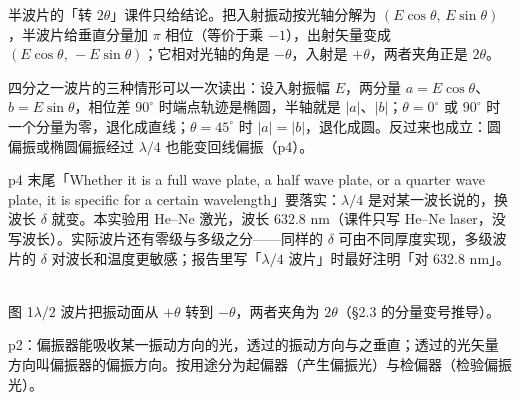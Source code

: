 \documentclass[11pt]{ctexart}
\begin{document}
半波片的「转 $2\theta$」课件只给结论。把入射振动按光轴分解为 $(E\cos\theta,\,E\sin\theta)$，半波片给垂直分量加 $\pi$ 相位（等价于乘 $-1$），出射矢量变成 $(E\cos\theta,\,-E\sin\theta)$；它相对光轴的角是 $-\theta$，入射是 $+\theta$，两者夹角正是 $2\theta$。


四分之一波片的三种情形可以一次读出：设入射振幅 $E$，两分量 $a=E\cos\theta$、$b=E\sin\theta$，相位差 $90^\circ$ 时端点轨迹是椭圆，半轴就是 $|a|$、$|b|$；$\theta=0^\circ$ 或 $90^\circ$ 时一个分量为零，退化成直线；$\theta=45^\circ$ 时 $|a|=|b|$，退化成圆。反过来也成立：圆偏振或椭圆偏振经过 $\lambda/4$ 也能变回线偏振（p4）。

p4 末尾「Whether it is a full wave plate, a half wave plate, or a quarter wave plate, it is specific for a certain wavelength」要落实：$\lambda/4$ 是对某一波长说的，换波长 $\delta$ 就变。本实验用 He--Ne 激光，波长 632.8 nm（课件只写 He--Ne laser，没写波长）。实际波片还有零级与多级之分——同样的 $\delta$ 可由不同厚度实现，多级波片的 $\delta$ 对波长和温度更敏感；报告里写「$\lambda/4$ 波片」时最好注明「对 632.8 nm」。

\begin{center}
\\[3pt]
{\small\color{inkgray} 图 1\quad $\lambda/2$ 波片把振动面从 $+\theta$ 转到 $-\theta$，两者夹角为 $2\theta$（§2.3 的分量变号推导）。}
\end{center}



p2：偏振器能吸收某一振动方向的光，透过的振动方向与之垂直；透过的光矢量方向叫偏振器的偏振方向。按用途分为起偏器（产生偏振光）与检偏器（检验偏振光）。
\end{document}
